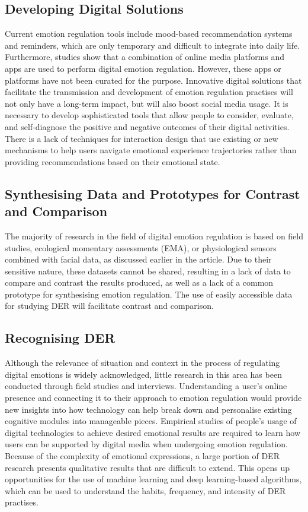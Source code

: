 \documentclass[lettersize,journal]{IEEEtran}
\begin{document}
\subsection{Developing Digital Solutions} Current emotion regulation tools include mood-based recommendation systems and reminders, which are only temporary and difficult to integrate into daily life. Furthermore, studies show that a combination of online media platforms and apps are used to perform digital emotion regulation. However, these apps or platforms have not been curated for the purpose.
Innovative digital solutions that facilitate the transmission and development of emotion regulation practises will not only have a long-term impact, but will also boost social media usage. It is necessary to develop sophisticated tools that allow people to consider, evaluate, and self-diagnose the positive and negative outcomes of their digital activities. There is a lack of techniques for interaction design that use existing or new mechanisms to help users navigate emotional experience trajectories rather than providing recommendations based on their emotional state.

\subsection{Synthesising Data and Prototypes for Contrast and Comparison} The majority of research in the field of digital emotion regulation is based on field studies, ecological momentary assessments (EMA), or physiological sensors combined with facial data, as discussed earlier in the article. Due to their sensitive nature, these datasets cannot be shared, resulting in a lack of data to compare and contrast the results produced, as well as a lack of a common prototype for synthesising emotion regulation. The use of easily accessible data for studying DER will facilitate contrast and comparison.

\subsection{Recognising DER} Although the relevance of situation and context in the process of regulating digital emotions is widely acknowledged, little research in this area has been conducted through field studies and interviews. Understanding a user's online presence and connecting it to their approach to emotion regulation would provide new insights into how technology can help break down and personalise existing cognitive modules into manageable pieces. Empirical studies of people's usage of digital technologies to achieve desired emotional results are required to learn how users can be supported by digital media when undergoing emotion regulation. Because of the complexity of emotional expressions, a large portion of DER research presents qualitative results that are difficult to extend. This opens up opportunities for the use of machine learning and deep learning-based algorithms, which can be used to understand the habits, frequency, and intensity of DER practises.
\end{document}
